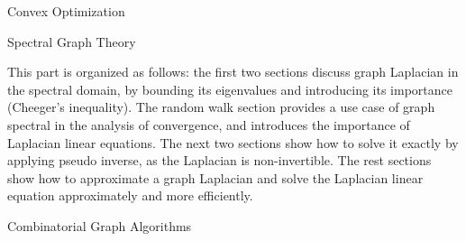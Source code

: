 \documentclass[11pt,landscape,a4paper]{article}
\newcommand{\HEADER}[1]{\begin{tcolorbox}
    \centering
    #1
\end{tcolorbox}}
\begin{document}
\small
\begin{multicols*}{3}


\HEADER{Convex Optimization}


\HEADER{Spectral Graph Theory}

This part is organized as follows: the first two sections discuss graph Laplacian in the spectral domain, by bounding its eigenvalues and introducing its importance (Cheeger's inequality). The random walk section provides a use case of graph spectral in the analysis of convergence, and introduces the importance of Laplacian linear equations. The next two sections show how to solve it exactly by applying pseudo inverse, as the Laplacian is non-invertible. The rest sections show how to approximate a graph Laplacian and solve the Laplacian linear equation approximately and more efficiently. 
















\HEADER{Combinatorial Graph Algorithms}





\end{multicols*}
\end{document}
